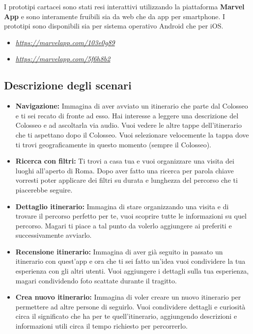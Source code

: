 I prototipi cartacei sono stati resi interattivi utilizzando la piattaforma \textbf{Marvel App} e sono interamente fruibili sia da web che da app per smartphone. I prototipi sono disponibili sia per sistema operativo Android che per iOS.

\begin{itemize}

\item{ \href{https://marvelapp.com/103e0g89}{\emph{https://marvelapp.com/103e0g89}}}
\item{ \href{https://marvelapp.com/5f6h8b2}{\emph{https://marvelapp.com/5f6h8b2}}}

\end{itemize}

\subsection{Descrizione degli scenari}

\begin{itemize}

\item \textbf{Navigazione:} Immagina di aver avviato un itinerario che parte dal Colosseo e ti sei recato di fronte ad esso. Hai interesse a leggere una descrizione del Colosseo e ad ascoltarla via audio. Vuoi vedere le altre tappe dell’itinerario che ti aspettano dopo il Colosseo. Vuoi selezionare velocemente la tappa dove ti trovi geograficamente in questo momento (sempre il Colosseo).

\item \textbf{Ricerca con filtri:} Ti trovi a casa tua e vuoi organizzare una visita dei luoghi all’aperto di Roma. Dopo aver fatto una ricerca per parola chiave vorresti poter applicare dei filtri su durata e lunghezza del percorso che ti piacerebbe seguire.

\item \textbf{Dettaglio itinerario:} Immagina di stare organizzando una visita  e di trovare il percorso perfetto per te, vuoi scoprire tutte le informazioni su quel percorso. Magari ti piace a tal punto da volerlo aggiungere ai preferiti e successivamente avviarlo.

\item \textbf{Recensione itinerario:} Immagina di aver già seguito in passato un itinerario con quest'app e ora che ti sei fatto un'idea vuoi condividere la tua esperienza con gli altri utenti. Vuoi aggiungere i dettagli sulla tua esperienza, magari condividendo foto scattate durante il tragitto.

\item \textbf{Crea nuovo itinerario:} Immagina di voler creare un nuovo itinerario per permettere ad altre persone di seguirlo. Vuoi condividere dettagli e curiosità circa il significato che ha per te quell'itinerario, aggiungendo descrizioni e informazioni utili circa il tempo richiesto per percorrerlo.

\end{itemize}

